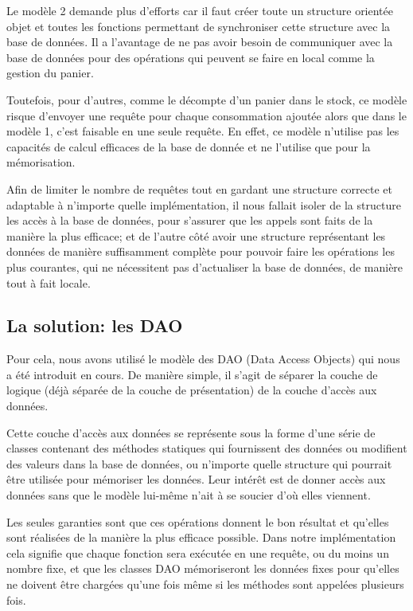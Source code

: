 \documentclass[a4paper,10pt]{article}
\begin{document}
Le modèle 2 demande plus d'efforts car il faut créer toute un structure orientée objet et toutes les fonctions permettant de synchroniser cette structure avec la base de données. Il a l'avantage de ne pas avoir besoin de communiquer avec la base de données pour des opérations qui peuvent se faire en local comme la gestion du panier.

Toutefois, pour d'autres, comme le décompte d'un panier dans le stock, ce modèle risque d'envoyer une requête pour chaque consommation ajoutée alors que dans le modèle 1, c'est faisable en une seule requête. En effet, ce modèle n'utilise pas les capacités de calcul efficaces de la base de donnée et ne l'utilise que pour la mémorisation.

Afin de limiter le nombre de requêtes tout en gardant une structure correcte et adaptable à n'importe quelle implémentation, il nous fallait isoler de la structure les accès à la base de données, pour s'assurer que les appels sont faits de la manière la plus efficace; et de l'autre côté avoir une structure représentant les données de manière suffisamment complète pour pouvoir faire les opérations les plus courantes, qui ne nécessitent pas d'actualiser la base de données, de manière tout à fait locale.

\subsection{La solution: les DAO}

Pour cela, nous avons utilisé le modèle des DAO (Data Access Objects) qui nous a été introduit en cours. De manière simple, il s'agit de séparer la couche de logique (déjà séparée de la couche de présentation) de la couche d'accès aux données.

Cette couche d'accès aux données se représente sous la forme d'une série de classes contenant des méthodes statiques qui fournissent des données ou modifient des valeurs dans la base de données, ou n'importe quelle structure qui pourrait être utilisée pour mémoriser les données. Leur intérêt est de donner accès aux données sans que le modèle lui-même n'ait à se soucier d'où elles viennent.

Les seules garanties sont que ces opérations donnent le bon résultat et qu'elles sont réalisées de la manière la plus efficace possible.
Dans notre implémentation cela signifie que chaque fonction sera exécutée en une requête, ou du moins un nombre fixe, et que les classes DAO mémoriseront les données fixes pour qu'elles ne doivent être chargées qu'une fois même si les méthodes sont appelées plusieurs fois.
\end{document}
